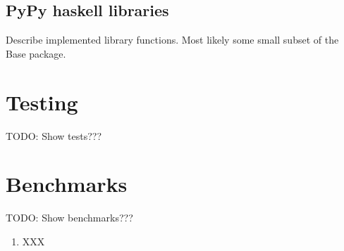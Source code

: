 \subsection{PyPy haskell libraries}

Describe implemented library functions. Most likely some small subset of the Base package.

\section{Testing}

TODO: Show tests???

\section{Benchmarks}

TODO: Show benchmarks???





\begin{enumerate}
\item XXX
\end{enumerate}






%





